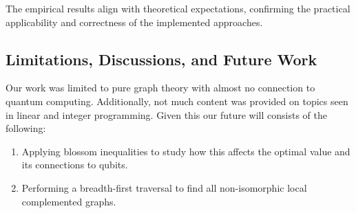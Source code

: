 \documentclass[12pt]{report} %
\begin{document}
The empirical results align with theoretical expectations, confirming the practical applicability and correctness of the implemented approaches. 

\subsection*{Limitations, Discussions, and Future Work}

Our work was limited to pure graph theory with almost no connection to quantum computing. Additionally, not much content was provided on topics seen in linear and integer programming. Given this our future will consists of the following: 

\begin{enumerate}[label=(\roman*), font=\itshape]
    \item Applying blossom inequalities to study how this affects the optimal value and its connections to qubits. 
    \item Performing a breadth-first traversal to find all non-isomorphic local complemented graphs. 
\end{enumerate}

\newpage



\end{document}

